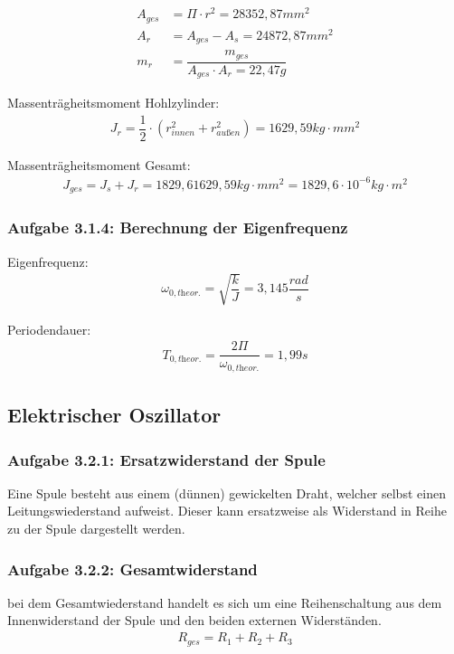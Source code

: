 \documentclass[a4paper]{scrartcl}
\numberwithin{equation}{subsection}
\begin{document}
\begin{align}
A_{ges} &= \Pi \cdot r^2 = 28352,87mm^2 \\
A_r &= A_{ges} - A_s = 24872,87mm^2 \\
m_r &= \dfrac{m_{ges}}{A_{ges} \cdot A_r = 22,47g}
\end{align}

Massenträgheitsmoment Hohlzylinder:
\begin{align}
J_r = \dfrac{1}{2} \cdot (r_{\textit{innen}}^2 + r_{\textit{außen}}^2) = 1629,59 kg \cdot mm^2
\end{align}

Massenträgheitsmoment Gesamt:
\begin{align}
J_{ges} = J_{s} + J_{r} = 1829,6 1629,59 kg \cdot mm^2 = 1829,6 \cdot 10^{-6} kg \cdot m^2
\end{align}
	
\subsubsection{Aufgabe 3.1.4: Berechnung der Eigenfrequenz}

Eigenfrequenz:
\begin{align}
\omega_{0,\textit{theor.}} = \sqrt{\dfrac{k}{J}} = 3,145 \dfrac{rad}{s}
\end{align}

Periodendauer:
\begin{align}
T_{0,\textit{theor.}} = \dfrac{2\Pi}{\omega_{0,\textit{theor.}}} = 1,99s
\end{align}

\subsection{Elektrischer Oszillator}
\subsubsection{Aufgabe 3.2.1: Ersatzwiderstand der Spule}

Eine Spule besteht aus einem (dünnen) gewickelten Draht, welcher selbst einen Leitungswiederstand aufweist.
Dieser kann ersatzweise als Widerstand in Reihe zu der Spule dargestellt werden.

\subsubsection{Aufgabe 3.2.2: Gesamtwiderstand}

bei dem Gesamtwiederstand handelt es sich um eine Reihenschaltung aus dem Innenwiderstand der Spule und den beiden externen Widerständen. 
\begin{align}
R_{ges} = R_1 + R_2 + R_3
\end{align}
\end{document}
